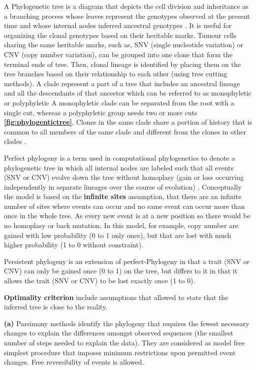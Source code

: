 A Phylogenetic tree is a diagram that depicts the cell division and inheritance as a branching process whose leaves represent the genotypes observed at the present time and whose internal nodes inferred ancestral genotypes \cite{satas2020scarlet}.
It is useful for organizing the clonal genotypes based on their heritable marks. Tumour cells sharing the same heritable marks, such as, SNV (single nucleotide variation) or CNV (copy number variation), can be grouped into one clone that form the terminal ends of tree. Then, clonal lineage is identified by placing them on the tree branches based on their relationship to each other (using tree cutting methods). A clade represent a part of a tree that includes an ancestral lineage and all the descendants of that ancestor which can be referred to as monophyletic or polyphyletic  A monophyletic clade can be separated from the root with a single cut, whereas a polyphyletic group needs two or more cuts \textbf{\autoref{fig:phylogentictree}}. Clones in the same clade share a portion of history that is common to all members of the same clade and different from the clones in other clades \cite{baum2008reading, baum2008phylogenics}.

Perfect phylogeny is a term used in computational phylogenetics to denote a phylogenetic tree in which all internal nodes are labeled such that all events (SNV or CNV) evolve down the tree without homoplasy (gain or loss occurring independently in separate lineages over the course of evolution) \cite{gusfield1997algorithms}. Conceptually the model is based on the \textbf{infinite sites} assumption, that there are an infinite number of sites where events can occur and no same event can occur more than once in the whole tree. As every new event is at a new position so there would be no homoplasy or back mutation. In this model, for example, copy number are gained with low probability (0 to 1 only once), but that are lost with much higher probability (1 to 0 without constraint).

Persistent phylogeny is an extension of perfect-Phylogeny in that a trait (SNV or CNV) can only be gained once (0 to 1) on the tree, but differs to it in that it allows the trait (SNV or CNV) to be lost exactly once (1 to 0).

\textbf{Optimality criterion} include assumptions that allowed to state that the inferred tree is close to the reality.

\textbf{(a)} Parsimony methods identify the phylogeny that requires the fewest necessary changes to explain the differences amongst observed sequences (the smallest number of steps needed to explain the data). They are considered as model free simplest procedure that imposes minimum restrictions upon permitted event changes. Free reversibility of events is allowed.

